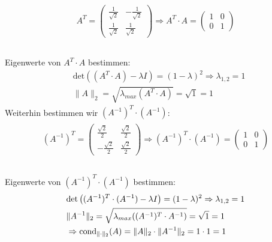\begin{align*}
\begin{split}
A^T =
\begin{pmatrix}
\frac{1}{\sqrt{2}}&-\frac{1}{\sqrt{2}}\\
\frac{1}{\sqrt{2}}&\frac{1}{\sqrt{2}}
\end{pmatrix}
\Rightarrow A^T\cdot A=
\begin{pmatrix}
1&0\\
0&1
\end{pmatrix}\\
\end{split}
\end{align*}\\
Eigenwerte von $A^T\cdot A$ bestimmen:\\
\begin{align*}
&\mathrm{det}\left((A^T\cdot A)-\lambda I\right)=(1-\lambda)^2
\Rightarrow \lambda_{1,2}=1\\
&\|A\|_2=\sqrt{\lambda_{max}(A^T\cdot A)}=\sqrt{1}=1
\end{align*}
Weiterhin bestimmen wir $(A^{-1})^T\cdot(A^{-1})$:\\
\begin{align*}
\begin{split}
(A^{-1})^T =
\begin{pmatrix}
\frac{\sqrt{2}}{2}&\frac{\sqrt{2}}{2}\\
-\frac{\sqrt{2}}{2}&\frac{\sqrt{2}}{2}
\end{pmatrix}
\Rightarrow (A^{-1})^T\cdot(A^{-1})=
\begin{pmatrix}
1&0\\
0&1
\end{pmatrix}\\
\end{split}
\end{align*}\\
Eigenwerte von $(A^{-1})^T\cdot(A^{-1})$ bestimmen:\\
\begin{align*}
&\mathrm{det}\left((A^{-1})^T\cdot(A^{-1})-\lambda I\right)=(1-\lambda)^2
\Rightarrow \lambda_{1,2}=1\\
&\|A^{-1}\|_2=\sqrt{\lambda_{max}((A^{-1})^T\cdot A^{-1})}=\sqrt{1}=1\\
&\Rightarrow\mathrm{cond}_{\| \cdot \|_2}(A)=\|A\|_2\cdot\|A^{-1}\|_2=1 \cdot 1=1\\
\end{align*}

